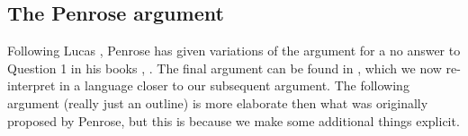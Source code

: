 \documentclass{amsart}  %
\numberwithin{equation}{section}
\theoremstyle{definition}
\theoremstyle{remark}
\begin{document}
{\subsection{The Penrose argument} \label{section:outline}
Following Lucas \cite{citeLucas}, Penrose has given variations of the argument for a no answer to Question 1 in his books \cite{citePenroseEmperor}, \cite{citePenroseShadows}. 
The final argument can be found in \cite{citePenroseBeyondShadow}, which we now re-interpret in a language closer to our subsequent argument. The following argument (really just an outline) is more elaborate then what was originally proposed by Penrose, but this is because we make some additional things explicit.
%
}
\end{document}
